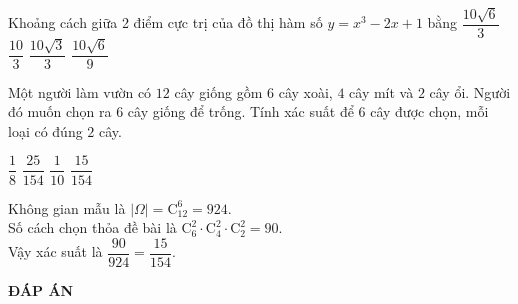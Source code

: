 \begin{ex}%
	Khoảng cách giữa 2 điểm cực trị của đồ thị hàm số $y=x^3-2x+1$ bằng
	\choice
	{ $\dfrac{10\sqrt{6}}{3}$}
	{$\dfrac{10}{3}$}
	{$\dfrac{10\sqrt{3}}{3}$}
	{\True $\dfrac{10\sqrt{6}}{9}$}
	
\end{ex}

\begin{ex}%
	Một người làm vườn có $12$ cây giống gồm $6$ cây xoài, $4$ cây mít và $2$ cây ổi. Người đó muốn chọn ra $6$ cây giống để trống. Tính xác suất để $6$ cây được chọn, mỗi loại có đúng $2$ cây.
	
	\choice
	{$\dfrac{1}{8}$}
	{$\dfrac{25}{154}$}
	{$\dfrac{1}{10}$}
	{\True $\dfrac{15}{154}$}
	
	\loigiai
	{Không gian mẫu là $|\Omega| = \mathrm{C}^6_{12}=924$.
		\\
		Số cách chọn thỏa đề bài là $\mathrm{C}^2_6\cdot\mathrm{C}^2_4\cdot\mathrm{C}^2_2=90$.
		\\
		Vậy xác suất là $\dfrac{90}{924}=\dfrac{15}{154}$.
		
	}
\end{ex}
\newpage
\begin{center}
	\textbf{ĐÁP ÁN}
\end{center}
\begin{multicols}{10}
	
\end{multicols}